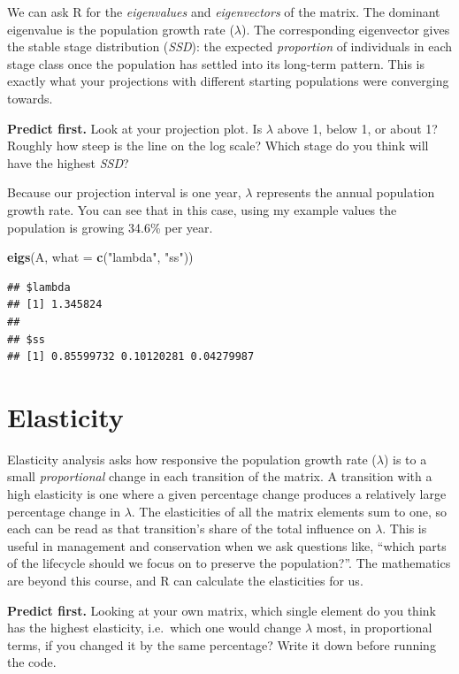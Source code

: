 \documentclass[
  a4paper]{book}
\newenvironment{Shaded}{\begin{snugshade}}{\end{snugshade}}
\newcommand{\AttributeTok}[1]{\textcolor[rgb]{0.13,0.29,0.53}{#1}}
\newcommand{\FunctionTok}[1]{\textcolor[rgb]{0.13,0.29,0.53}{\textbf{#1}}}
\newcommand{\NormalTok}[1]{#1}
\newcommand{\StringTok}[1]{\textcolor[rgb]{0.31,0.60,0.02}{#1}}
\begin{document}
We can ask R for the \emph{eigenvalues} and \emph{eigenvectors} of the matrix. The dominant eigenvalue is the population growth rate (\(\lambda\)). The corresponding eigenvector gives the stable stage distribution (\emph{SSD}): the expected \emph{proportion} of individuals in each stage class once the population has settled into its long-term pattern. This is exactly what your projections with different starting populations were converging towards.

\textbf{Predict first.} Look at your projection plot. Is \(\lambda\) above 1, below 1, or about 1? Roughly how steep is the line on the log scale? Which stage do you think will have the highest \emph{SSD}?

Because our projection interval is one year, \(\lambda\) represents the annual population growth rate. You can see that in this case, using my example values the population is growing 34.6\% per year.

\begin{Shaded}
\begin{Highlighting}[]
\FunctionTok{eigs}\NormalTok{(A, }\AttributeTok{what =} \FunctionTok{c}\NormalTok{(}\StringTok{"lambda"}\NormalTok{, }\StringTok{"ss"}\NormalTok{))}
\end{Highlighting}
\end{Shaded}

\begin{verbatim}
## $lambda
## [1] 1.345824
## 
## $ss
## [1] 0.85599732 0.10120281 0.04279987
\end{verbatim}

\section{Elasticity}\label{elasticity}

Elasticity analysis asks how responsive the population growth rate (\(\lambda\)) is to a small \emph{proportional} change in each transition of the matrix. A transition with a high elasticity is one where a given percentage change produces a relatively large percentage change in \(\lambda\). The elasticities of all the matrix elements sum to one, so each can be read as that transition's share of the total influence on \(\lambda\). This is useful in management and conservation when we ask questions like, ``which parts of the lifecycle should we focus on to preserve the population?''. The mathematics are beyond this course, and R can calculate the elasticities for us.

\textbf{Predict first.} Looking at your own matrix, which single element do you think has the highest elasticity, i.e.~which one would change \(\lambda\) most, in proportional terms, if you changed it by the same percentage? Write it down before running the code.
\end{document}

